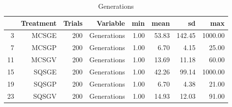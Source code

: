 \begin{table}[ht]
\centering
\begin{tabular}{rrrrrrrr}
  \hline
 & Treatment & Trials & Variable & min & mean & sd & max \\ 
  \hline
3 & MCSGE & 200 & Generations & 1.00 & 53.83 & 142.45 & 1000.00 \\ 
  7 & MCSGP & 200 & Generations & 1.00 & 6.70 & 4.15 & 25.00 \\ 
  11 & MCSGV & 200 & Generations & 1.00 & 13.69 & 11.18 & 60.00 \\ 
  15 & SQSGE & 200 & Generations & 1.00 & 42.26 & 99.14 & 1000.00 \\ 
  19 & SQSGP & 200 & Generations & 1.00 & 6.70 & 4.38 & 21.00 \\ 
  23 & SQSGV & 200 & Generations & 1.00 & 14.93 & 12.03 & 91.00 \\ 
   \hline
\end{tabular}
\caption{Generations} 
\end{table}
